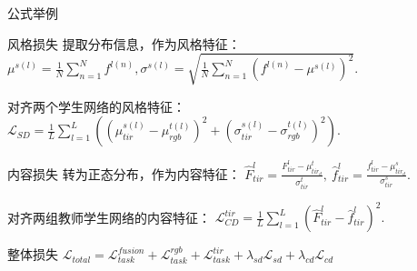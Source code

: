 \documentclass[aspectratio=169]{ahu-slide}
\begin{document}
\begin{frame}{公式举例}
\begin{block}{风格损失}
提取分布信息，作为风格特征：
$\mu^{s(l)} = \frac{1}{N} \sum_{n=1}^{N} f^{l(n)}, \sigma^{s(l)} = \sqrt{\frac{1}{N} \sum_{n=1}^{N} (f^{l(n)} - \mu^{s(l)})^2}.$

对齐两个学生网络的风格特征：
$\mathcal{L}_{SD}=\frac{1}{L} \sum_{l=1}^L((\mu^{s(l)}_{tir}-\mu^{t(l)}_{rgb})^2 + (\sigma^{s(l)}_{tir}-\sigma^{t(l)}_{rgb})^2).$
\end{block}

\begin{block}{内容损失}
转为正态分布，作为内容特征：
$\hat{F}^l_{tir} = \frac{F^l_{tir} - \mu^t_{tir_d}}{\sigma^t_{tir}},  \
\hat{f}^l_{tir} = \frac{f^l_{tir} - \mu^s_{tir_d}}{\sigma^s_{tir}}.$

对齐两组教师学生网络的内容特征：
$\mathcal{L}^{tir}_{CD}= \frac{1}{L} \sum_{l=1}^L (\hat{F}^{l}_{tir} - \hat{f}^{l}_{tir})^2.$
\end{block}

\begin{block}{整体损失}
$\mathcal{L}_{total} = \mathcal{L}_{task}^{fusion} + \mathcal{L}_{task}^{rgb} + \mathcal{L}_{task}^{tir} + \lambda_{sd}\mathcal{L}_{sd} + \lambda_{cd}\mathcal{L}_{cd}$
\end{block}
\end{frame}
\end{document}
